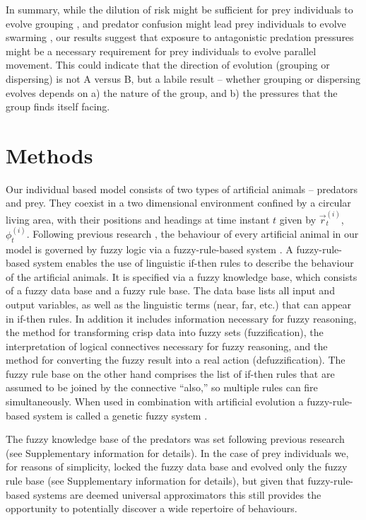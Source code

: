 In summary, while the dilution of risk might be sufficient for prey individuals to evolve grouping \cite{biswas2014causes}, and predator confusion might lead prey individuals to evolve swarming \cite{kunz2006prey,olson2013predator,olson2016evolution}, our results suggest that exposure to antagonistic predation pressures might be a necessary requirement for prey individuals to evolve parallel movement. This could indicate that the direction of evolution (grouping or dispersing) is not A versus B, but a labile result -- whether grouping or dispersing evolves depends on a) the nature of the group, and b) the pressures that the group finds itself facing.

\section{Methods}

Our individual based model consists of two types of artificial animals -- predators and prey. They coexist in a two dimensional environment confined by a circular living area, with their positions and headings at time instant $t$ given by $\vec{r}^{(i)}_t$, $\phi^{(i)}_t$. Following previous research \cite{dellorco2014simulation,demsar2014simulated,lebarbajec2005simulating,lucic2002transportation,tron2004mathematical}, the behaviour of every artificial animal in our model is governed by fuzzy logic \cite{zadeh1965fuzzy} via a fuzzy-rule-based system \cite{mamdani1974application}. A fuzzy-rule-based system enables the use of linguistic if-then rules to describe the behaviour of the artificial animals. It is specified via a fuzzy knowledge base, which consists of a fuzzy data base and a fuzzy rule base. The data base lists all input and output variables, as well as the linguistic terms (\eg near, far, etc.) that can appear in if-then rules. In addition it includes information necessary for fuzzy reasoning, \ie the method for transforming crisp data into fuzzy sets (fuzzification), the interpretation of logical connectives necessary for fuzzy reasoning, and the method for converting the fuzzy result into a real action (defuzzification). The fuzzy rule base on the other hand comprises the list of if-then rules that are assumed to be joined by the connective ``also,'' so multiple rules can fire simultaneously. When used in combination with artificial evolution a fuzzy-rule-based system is called a genetic fuzzy system \cite{cordon2004ten,fernandez2015revisiting,herrera2008genetic}. 

The fuzzy knowledge base of the predators was set following previous research \cite{demsar2014simulated} (see Supplementary information for details). In the case of prey individuals we, for reasons of simplicity, locked the fuzzy data base and evolved only the fuzzy rule base (see Supplementary information for details), but given that fuzzy-rule-based systems are deemed universal approximators \cite{castro1995fuzzy} this still provides the opportunity to potentially discover a wide repertoire of behaviours. 

